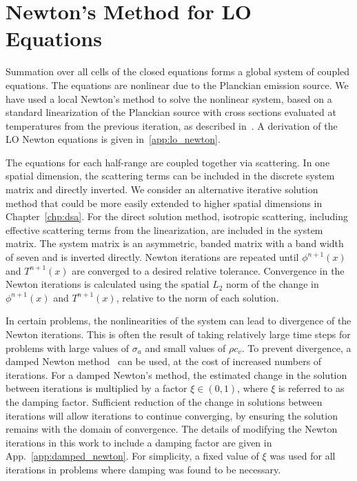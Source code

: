 \section{Newton's Method for LO Equations}
\label{sec:newton_overview}

Summation over all cells of the closed equations forms a global system of coupled equations.
The equations are nonlinear due to the Planckian emission source.  
We have used a local Newton's method to solve the nonlinear system, based on a standard linearization of the Planckian source with cross
sections evaluated at temperatures from the previous iteration, as described
in~\cite{morel_ldtrt}.  A derivation of the LO Newton equations is given
in~\ref{app:lo_newton}.

The equations for each half-range are coupled together via scattering.  
In one spatial dimension, the scattering terms can be included in the discrete system
matrix and directly inverted.  We consider an alternative iterative solution method that
could be more easily extended to higher spatial dimensions in Chapter~\ref{chp:dsa}.
For the direct solution method, isotropic scattering,
including effective scattering terms from the linearization, are included in the system matrix. The system
matrix is an asymmetric, banded matrix with a band width of seven and is inverted
directly. 
Newton iterations are repeated until $\phi^{n+1}(x)$ and $T^{n+1}(x)$ are converged
to a desired relative tolerance.  Convergence in the Newton iterations is calculated using the spatial $L_2$
norm of the change in $\phi^{n+1}(x)$ and $T^{n+1}(x)$, relative to the norm of each
solution.  

In certain problems, the nonlinearities of the system can lead to divergence of the Newton
iterations.  This is often the result of taking relatively large time steps for problems with large
values of $\sigma_a$ and small values of $\rho c_v$.  To prevent divergence, a damped
Newton method~\cite{damped_newton} can be used, at the cost of increased numbers of iterations.  For a
damped Newton's method, the estimated change in the solution between iterations is multiplied by a factor $\xi\in(0,1)$, where $\xi$ is referred to as the damping factor.
Sufficient reduction of the change in solutions between iterations will allow iterations
to continue converging, by ensuring the solution remains with the domain of convergence.  
The details of modifying the Newton iterations in this work to include a damping factor are given in
App.~\ref{app:damped_newton}.  For simplicity, a fixed value of $\xi$ was used for all
iterations in problems where damping was found to be necessary.

